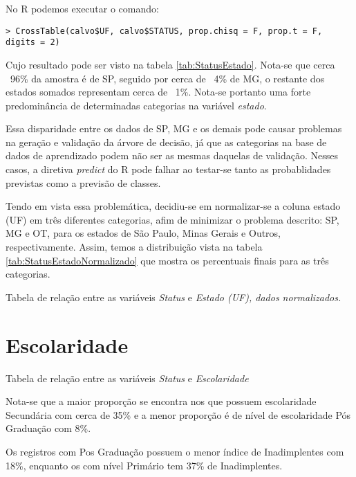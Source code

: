 No R podemos executar o comando:

\begin{verbatim}
> CrossTable(calvo$UF, calvo$STATUS, prop.chisq = F, prop.t = F, digits = 2)
\end{verbatim}

Cujo resultado pode ser visto na tabela \ref{tab:StatusEstado}. Nota-se que cerca ~96\% da amostra é de SP, 
seguido por cerca de ~4\% de MG, o restante dos estados somados representam cerca de ~1\%. Nota-se portanto uma 
forte predominância de determinadas categorias na variável \emph{estado}.

Essa disparidade entre os dados de SP, MG e os demais pode causar problemas na geração e validação da árvore de decisão, já que
as categorias na base de dados de aprendizado podem não ser as mesmas daquelas de validação. Nesses casos, a diretiva \emph{predict} do R pode falhar ao testar-se tanto as probablidades previstas como a previsão de classes. 

Tendo em vista essa problemática, decidiu-se em normalizar-se a coluna estado (UF) em três diferentes categorias, afim de minimizar o problema descrito: SP, MG e OT, para os estados de São Paulo, Minas Gerais e Outros, respectivamente. Assim, temos a distribuição vista na tabela \ref{tab:StatusEstadoNormalizado} que mostra os percentuais finais para as três categorias.

\begin{table}[h]
\centering

\caption{\label{tab:StatusEstadoNormalizado}Tabela de relação entre as variáveis \emph{Status} e \emph{Estado (UF), dados normalizados.}}
\end{table}

\section{Escolaridade}

\begin{table}[h]
\centering

\caption{\label{tab:StatusEscolaridade}Tabela de relação entre as variáveis \emph{Status
} e \emph{Escolaridade}}
\end{table}

Nota-se que a maior proporção se encontra nos que possuem escolaridade
Secundária com cerca de 35\% e a menor proporção é de nível de escolaridade
Pós Graduação com 8\%.

Os registros com Pos Graduação possuem o menor índice de Inadimplentes
com 18\%, enquanto os com nível Primário tem 37\% de Inadimplentes.

